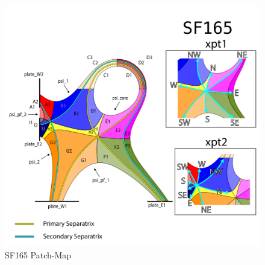 \begin{figure}[H]
    \centering
        \includegraphics[width=\textwidth]{figures/configurations/SF165_collection.pdf}
        \caption{SF165 Patch-Map}
        \label{fig:sf165_patch_map}
\end{figure}
